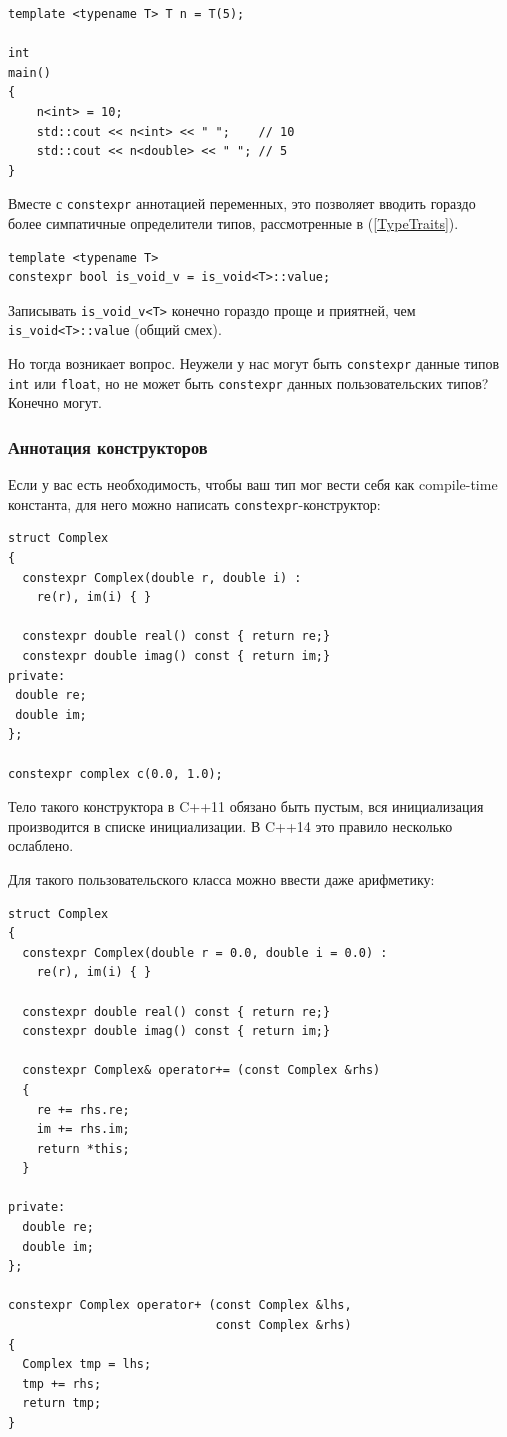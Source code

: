 \documentclass[a4paper,12pt,oneside]{article}
\begin{document}
\begin{lstlisting}
template <typename T> T n = T(5);

int 
main()
{
    n<int> = 10;
    std::cout << n<int> << " ";    // 10
    std::cout << n<double> << " "; // 5
}
\end{lstlisting}

Вместе с \lstinline!constexpr! аннотацией переменных, это позволяет вводить гораздо более симпатичные определители типов, рассмотренные в (\ref{TypeTraits}).

\begin{lstlisting}
template <typename T> 
constexpr bool is_void_v = is_void<T>::value;
\end{lstlisting}

Записывать \lstinline!is_void_v<T>! конечно гораздо проще и приятней, чем \lstinline!is_void<T>::value! (общий смех).

Но тогда возникает вопрос. Неужели у нас могут быть \lstinline!constexpr! данные типов \lstinline!int! или \lstinline!float!, но не может быть \lstinline!constexpr! данных пользовательских типов? Конечно могут.

\subsubsection{Аннотация конструкторов}\label{Constexpr:ctors}

Если у вас есть необходимость, чтобы ваш тип мог вести себя как compile-time константа, для него можно написать \lstinline!constexpr!-конструктор:

\begin{lstlisting}
struct Complex
{
  constexpr Complex(double r, double i) : 
    re(r), im(i) { }

  constexpr double real() const { return re;}
  constexpr double imag() const { return im;}
private:
 double re;
 double im;
};

constexpr complex c(0.0, 1.0);
\end{lstlisting}

Тело такого конструктора в C++11 обязано быть пустым, вся инициализация производится в списке инициализации. В C++14 это правило несколько ослаблено.

Для такого пользовательского класса можно ввести даже арифметику:

\begin{lstlisting}
struct Complex
{
  constexpr Complex(double r = 0.0, double i = 0.0) : 
    re(r), im(i) { }

  constexpr double real() const { return re;}
  constexpr double imag() const { return im;}

  constexpr Complex& operator+= (const Complex &rhs)
  {
    re += rhs.re;
    im += rhs.im;
    return *this;
  }

private:
  double re;
  double im;
};

constexpr Complex operator+ (const Complex &lhs, 
                             const Complex &rhs)
{
  Complex tmp = lhs;
  tmp += rhs;
  return tmp;
}
\end{lstlisting}
\end{document}
